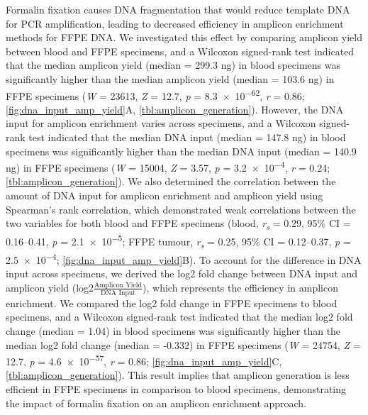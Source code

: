 Formalin fixation causes DNA fragmentation that would reduce template DNA for PCR amplification, leading to decreased efficiency in amplicon enrichment methods for FFPE DNA. We investigated this effect by comparing amplicon yield between blood and FFPE specimens, and a Wilcoxon signed-rank test indicated that the median amplicon yield (median = 299.3 ng) in blood specimens was significantly higher than the median amplicon yield (median = 103.6 ng) in FFPE specimens (\textit{W} = 23613, \textit{Z} = 12.7, \textit{p} = \num{8.3e-62}, \textit{r} = 0.86; \autoref{fig:dna_input_amp_yield}A, \autoref{tbl:amplicon_generation}). However, the DNA input for amplicon enrichment varies across specimens, and a Wilcoxon signed-rank test indicated that the median DNA input (median = 147.8 ng) in blood specimens was significantly higher than the median DNA input (median = 140.9 ng) in FFPE specimens (\textit{W} = 15004, \textit{Z} = 3.57, \textit{p} = \num{3.2e-4}, \textit{r} = 0.24; \autoref{tbl:amplicon_generation}). We also determined the correlation between the amount of DNA input for amplicon enrichment and amplicon yield using Spearman's rank correlation, which demonstrated weak correlations between the two variables for both blood and FFPE specimens (blood, \textit{r\textsubscript{s}} = 0.29, 95\% CI = 0.16--0.41, \textit{p} = \num{2.1e-5}; FFPE tumour, \textit{r\textsubscript{s}} = 0.25, 95\% CI = 0.12--0.37, \textit{p} = \num{2.5e-4}; \autoref{fig:dna_input_amp_yield}B). To account for the difference in DNA input across specimens, we derived the log2 fold change between DNA input and amplicon yield (log2\( \frac{\text{Amplicon Yield}}{\text{DNA Input}} \)), which represents the efficiency in amplicon enrichment. We compared the log2 fold change in FFPE specimens to blood specimens, and a Wilcoxon signed-rank test indicated that the median log2 fold change (median = 1.04) in blood specimens was significantly higher than the median log2 fold change (median = -0.332) in FFPE specimens (\textit{W} = 24754, \textit{Z} = 12.7, \textit{p} = \num{4.6e-57}, \textit{r} = 0.86; \autoref{fig:dna_input_amp_yield}C, \autoref{tbl:amplicon_generation}). This result implies that amplicon generation is less efficient in FFPE specimens in comparison to blood specimens, demonstrating the impact of formalin fixation on an amplicon enrichment approach.

